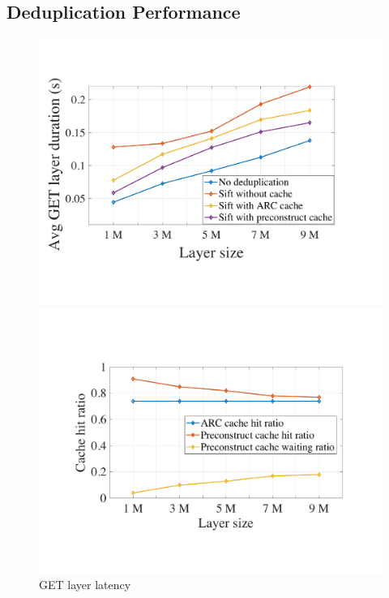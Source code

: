 

\subsection{Deduplication Performance}
\label{sec:eval-dedup}


\begin{figure}[t]
	\centering
	\begin{minipage}{0.3\textwidth}
		\centering
		\includegraphics[width=\textwidth]{graphs/1nodegetlayerlatency.pdf}
		\caption{GET layer latency}
		\label{fig:eval-1nodegetlayerlatency}
	\end{minipage}%
\hspace{1mm}
	\begin{minipage}{0.29\textwidth}
		\centering
		\includegraphics[width=\textwidth]{graphs/cachehitratio.pdf}

\end{minipage}
\end{figure}
